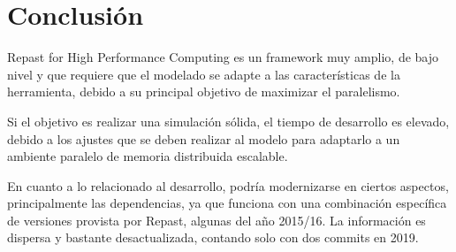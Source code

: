 \section{Conclusión}

Repast for High Performance Computing es un framework muy amplio, de
bajo nivel y que requiere que el modelado se adapte a las
características de la herramienta, debido a su principal objetivo de
maximizar el paralelismo.

Si el objetivo es realizar una simulación sólida, el tiempo de
desarrollo es elevado, debido a los ajustes que se deben realizar al
modelo para adaptarlo a un ambiente paralelo de memoria distribuida
escalable.

En cuanto a lo relacionado al desarrollo, podría modernizarse en ciertos
aspectos, principalmente las dependencias, ya que funciona con una
combinación específica de versiones provista por Repast, algunas del año
2015/16. La información es dispersa y bastante desactualizada, contando
solo con dos commits en 2019.